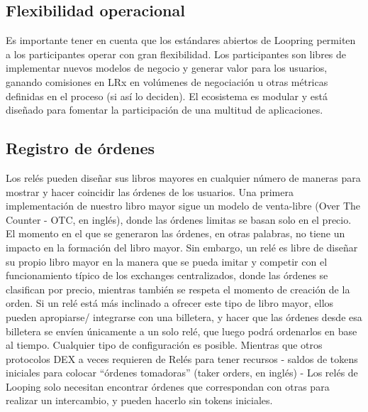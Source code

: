\documentclass[UTF8,nofonts]{article}
\begin{document}
\begin{multicols}{2}
\section{Flexibilidad operacional\label{sec:business_model}}
Es importante tener en cuenta que los est\'andares abiertos de Loopring permiten a los participantes operar con gran flexibilidad. Los participantes son libres de implementar nuevos modelos de negocio y generar valor para los usuarios, ganando comisiones en LRx en vol\'umenes de negociaci\'on u otras m\'etricas definidas en el proceso (si as\'i lo deciden). El ecosistema es modular y est\'a dise\~nado para fomentar la participaci\'on de una multitud de aplicaciones.

\subsection{Registro de \'ordenes \label{sec:order_book}}
Los rel\'es pueden dise\~nar sus libros mayores en cualquier n\'umero de maneras para mostrar y hacer coincidir las \'ordenes de los usuarios. Una primera implementaci\'on de nuestro libro mayor sigue un modelo de venta-libre (Over The Counter - OTC, en ingl\'es), donde las \'ordenes limitas se basan solo en el precio. El momento en el que se generaron las \'ordenes, en otras palabras, no tiene un impacto en la formaci\'on del libro mayor. Sin embargo, un rel\'e es libre de dise\~nar su propio libro mayor en la manera que se pueda imitar y competir con el funcionamiento t\'ipico de los exchanges centralizados, donde las \'ordenes se clasifican por precio, mientras tambi\'en se respeta el momento de creaci\'on de la orden. Si un rel\'e est\'a m\'as inclinado a ofrecer este tipo de libro mayor, ellos pueden apropiarse/ integrarse con una billetera, y hacer que las \'ordenes desde esa billetera se env\'ien \'unicamente a un solo rel\'e, que luego podr\'a ordenarlos en base al tiempo. Cualquier tipo de configuraci\'on es posible. 
Mientras que otros protocolos DEX a veces requieren de Rel\'es para tener recursos - saldos de tokens iniciales para colocar \enquote{\'ordenes tomadoras} (taker orders, en ingl\'es) - Los rel\'es de Looping solo necesitan encontrar \'ordenes que correspondan con otras para realizar un intercambio, y pueden hacerlo sin tokens iniciales.



\end{multicols}
\end{document}
